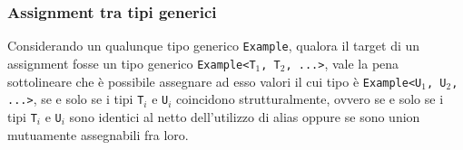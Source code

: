 \subsubsection{Assignment tra tipi generici}
Considerando un qualunque tipo generico \texttt{Example}, qualora il target di un assignment fosse un 
tipo generico \texttt{Example<T$_1$, T$_2$, ...>}, vale la pena sottolineare che è possibile assegnare 
ad esso valori il cui tipo è \texttt{Example<U$_1$, U$_2$, ...>}, se e solo se i tipi \texttt{T$_i$} e 
\texttt{U$_i$} coincidono strutturalmente, ovvero se e solo se i tipi \texttt{T$_i$} e 
\texttt{U$_i$} sono identici al netto dell'utilizzo di alias oppure se sono union 
mutuamente assegnabili fra loro. \\